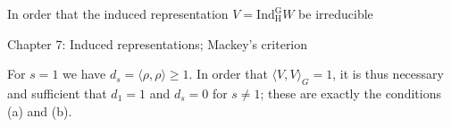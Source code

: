 In order that the induced representation $V = \text{Ind}_{\text{H}}^{\text{G}}W$ be irreducible

Chapter 7: Induced representations; Mackey's criterion

For $s = 1$ we have $d_s = \langle \rho, \rho \rangle \geqslant 1$. In order that $\langle V, V \rangle_G = 1$, it is thus necessary and sufficient that $d_1 = 1$ and $d_s = 0$ for $s \neq 1$; these are exactly the conditions (a) and (b).
